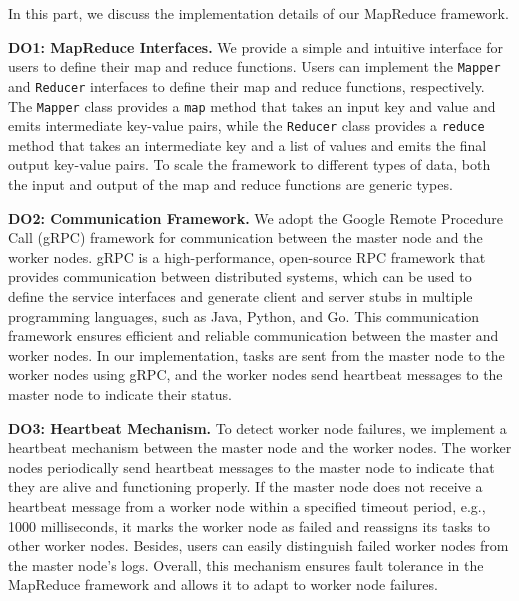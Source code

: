 In this part, we discuss the implementation details of our MapReduce framework. 

\textbf{DO1: MapReduce Interfaces.} We provide a simple and intuitive interface for users to define their map and reduce functions. Users can implement the \texttt{Mapper} and \texttt{Reducer} interfaces to define their map and reduce functions, respectively. The \texttt{Mapper} class provides a \texttt{map} method that takes an input key and value and emits intermediate key-value pairs, while the \texttt{Reducer} class provides a \texttt{reduce} method that takes an intermediate key and a list of values and emits the final output key-value pairs. To scale the framework to different types of data, both the input and output of the map and reduce functions are generic types.

\textbf{DO2: Communication Framework.} We adopt the Google Remote Procedure Call (gRPC) framework for communication between the master node and the worker nodes. gRPC is a high-performance, open-source RPC framework that provides communication between distributed systems, which can be used to define the service interfaces and generate client and server stubs in multiple programming languages, such as Java, Python, and Go. This communication framework ensures efficient and reliable communication between the master and worker nodes. In our implementation, tasks are sent from the master node to the worker nodes using gRPC, and the worker nodes send heartbeat messages to the master node to indicate their status. 

\textbf{DO3: Heartbeat Mechanism.} To detect worker node failures, we implement a heartbeat mechanism between the master node and the worker nodes. The worker nodes periodically send heartbeat messages to the master node to indicate that they are alive and functioning properly. If the master node does not receive a heartbeat message from a worker node within a specified timeout period, e.g., 1000 milliseconds, it marks the worker node as failed and reassigns its tasks to other worker nodes. Besides, users can easily distinguish failed worker nodes from the master node's logs. Overall, this mechanism ensures fault tolerance in the MapReduce framework and allows it to adapt to worker node failures.

 
